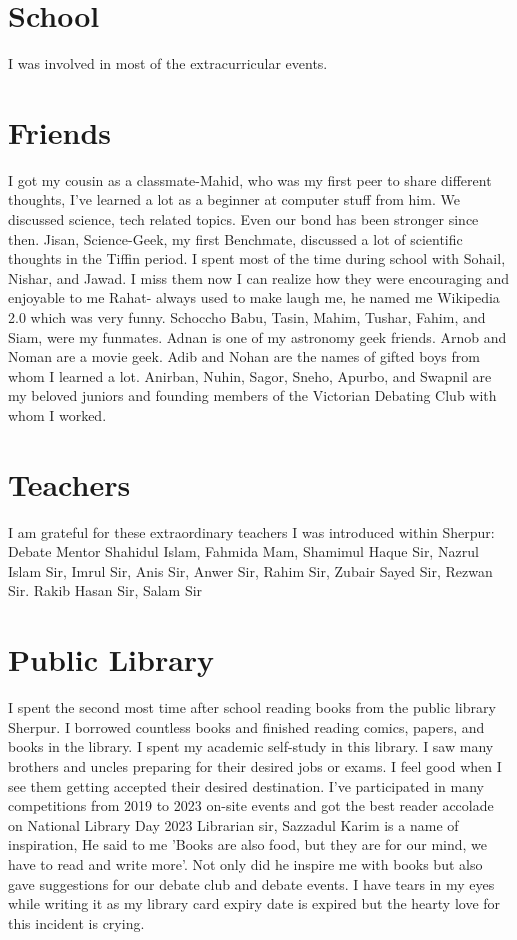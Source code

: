 \documentclass{article}
\begin{document}
\section{School}
I was involved in most of the extracurricular events. 

\section{Friends} 

I got my cousin as a classmate-Mahid, who was my first peer to share different thoughts, I've learned a lot as a beginner at computer stuff from him. We discussed science, tech related topics. Even our bond has been stronger since then.
Jisan, Science-Geek, my first Benchmate, discussed a lot of scientific thoughts in the Tiffin period. I spent most of the time during school with Sohail, Nishar, and Jawad. I miss them now I can realize how they were encouraging and enjoyable to me Rahat- always used to make laugh me, he named me Wikipedia 2.0 which was very funny. Schoccho Babu, Tasin, Mahim, Tushar, Fahim, and Siam, were my funmates. Adnan is one of my astronomy geek friends. Arnob and Noman are a movie geek. Adib and Nohan are the names of gifted boys from whom I learned a lot. Anirban, Nuhin, Sagor, Sneho, Apurbo, and Swapnil are my beloved juniors and founding members of the Victorian Debating Club with whom I worked.



\section{Teachers} I am grateful for these extraordinary teachers I was introduced within Sherpur:
Debate Mentor Shahidul Islam, Fahmida Mam, Shamimul Haque Sir, Nazrul Islam Sir, Imrul Sir, Anis Sir, Anwer Sir, Rahim Sir, Zubair Sayed Sir, Rezwan Sir. Rakib Hasan Sir, Salam Sir


\section{Public Library} 
I spent the second most time after school reading books from the public library Sherpur. I borrowed countless books and finished reading comics, papers, and books in the library. I spent my academic self-study in this library. I saw many brothers and uncles preparing for their desired jobs or exams. I feel good when I see them getting accepted their desired destination. I've participated in many competitions from 2019 to 2023 on-site events and got the best reader accolade on National Library Day 2023 Librarian sir, Sazzadul Karim is a name of inspiration, He said to me 'Books are also food, but they are for our mind, we have to read and write more'. Not only did he inspire me with books but also gave suggestions for our debate club and debate events. I have tears in my eyes while writing it as my library card expiry date is expired but the hearty love for this incident is crying.
\end{document}
